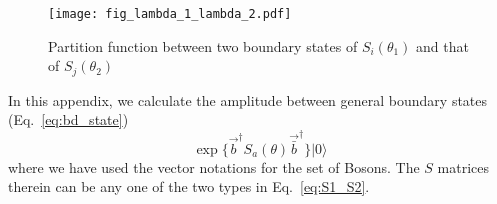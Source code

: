 
\begin{figure}[h]
\centering
\texttt{[image: fig\_lambda\_1\_lambda\_2.pdf]}
\caption{Partition function between two boundary states of $S_i( \theta_1)$ and that of $S_j( \theta_2 )$}
\label{fig:fig_lambda_1_lambda_2}
\end{figure}

In this appendix, we calculate the amplitude between general boundary states (\cf  Eq.~\eqref{eq:bd_state})
\begin{equation}
\exp\Big\{  \vec{b}^{\dagger} S_a( \theta )   \vec{\bar{b}}^{\dagger}\Big\}  |0  \rangle
\end{equation}
where we have used the vector notations for the set of Bosons. The $S$ matrices therein can be any one of the two types in Eq.~\eqref{eq:S1_S2}. 

